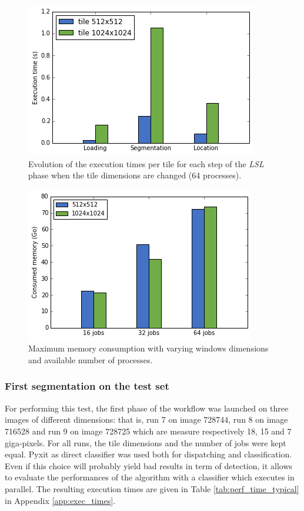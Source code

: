 \begin{figure}
	\center
	\includegraphics[scale=0.5]{image/perf_lsl_tile_dim.png}
	\caption{Evolution of the execution times per tile for each step of the \textit{LSL} phase when the tile dimensions are changed (64 processes).}
	\label{fig:perf_tile_dim_lsl}
\end{figure}

\begin{figure}
	\center
	\includegraphics[scale=0.5]{image/perf_memory.png}
	\caption{Maximum memory consumption with varying windows dimensions and available number of processes.}
	\label{fig:perf_memory}
\end{figure}

\subsubsection{First segmentation on the test set}
\label{sssec:perf_second_test}
For performing this test, the first phase of the workflow was launched on three images of different dimensions: that is, run 7 on image 728744, run 8 on image 716528 and run 9 on image 728725 which are measure respectively 18, 15 and 7 giga-pixels. For all runs, the tile dimensions and the number of jobs were kept equal. Pyxit as direct classifier was used both for dispatching and classification. Even if this choice will probably yield bad results in term of detection, it allows to evaluate the performances of the algorithm with a classifier which executes in parallel. The resulting execution times are given in Table \ref{tab:perf_time_typical} in Appendix \ref{app:exec_times}.

